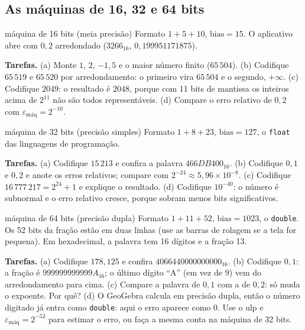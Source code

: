\subsection{As máquinas de 16, 32 e 64 bits}

\begin{atividade}{máquina de 16 bits (meia precisão)}{\arqMdezesseis}
Formato $1+5+10$, $\text{bias}=15$. O aplicativo abre com $0{,}2$ arredondado
($3266_{16}$, $0{,}199951171875$).

\textbf{Tarefas.} (a) Monte $1$, $2$, $-1{,}5$ e o maior número finito ($65\,504$). (b) Codifique
$65\,519$ e $65\,520$ por arredondamento: o primeiro vira $65\,504$ e o segundo, $+\infty$.
(c) Codifique $2049$: o resultado é $2048$, porque com 11 bits de mantissa os inteiros acima de
$2^{11}$ não são todos representáveis. (d) Compare o erro relativo de $0{,}2$ com $\varepsilon_{\text{máq}}=2^{-10}$.
\end{atividade}

\begin{atividade}{máquina de 32 bits (precisão simples)}{\arqMtrintadois}
Formato $1+8+23$, $\text{bias}=127$, o \texttt{float} das linguagens de programação.

\textbf{Tarefas.} (a) Codifique $15\,213$ e confira a palavra $466DB400_{16}$. (b) Codifique $0{,}1$ e
$0{,}2$ e anote os erros relativos; compare com $2^{-24}\approx5{,}96\times10^{-8}$.
(c) Codifique $16\,777\,217=2^{24}+1$ e explique o resultado. (d) Codifique $10^{-40}$: o número é
subnormal e o erro relativo cresce, porque sobram menos bits significativos.
\end{atividade}

\begin{atividade}{máquina de 64 bits (precisão dupla)}{\arqMsessentaquatro}
Formato $1+11+52$, $\text{bias}=1023$, o \texttt{double}. Os 52 bits da fração estão em duas linhas
(use as barras de rolagem se a tela for pequena). Em hexadecimal, a palavra tem 16 dígitos e a fração 13.

\textbf{Tarefas.} (a) Codifique $178{,}125$ e confira $4066440000000000_{16}$. (b) Codifique $0{,}1$:
a fração é $999999999999A_{16}$; o último dígito ``A'' (em vez de 9) vem do arredondamento para cima.
(c) Compare a palavra de $0{,}1$ com a de $0{,}2$: só muda o expoente. Por quê?
(d) O GeoGebra calcula em precisão dupla, então o número digitado já entra como \texttt{double}: aqui o
erro aparece como $0$. Use o ulp e $\varepsilon_{\text{máq}}=2^{-52}$ para estimar o erro, ou faça a mesma conta na
máquina de 32 bits.
\end{atividade}

